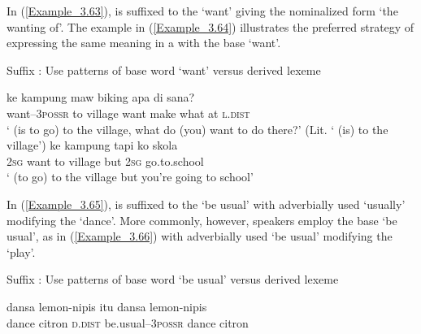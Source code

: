 In (\ref{Example_3.63}),  is suffixed to the   ‘want’ giving the nominalized form  ‘the wanting of’. The example in (\ref{Example_3.64}) illustrates the preferred strategy of expressing the same meaning in a  with the base  ‘want’.



\begin{styleExampleTitle}
{Suffix : Use patterns of base word  ‘want’ versus derived lexeme}
\end{styleExampleTitle}
\ea
\label{Example_3.63}

 {ke} {kampung} {maw} {biking} {apa} {di} {sana?}\\ %
 want–\textsc{3possr}  to  village  want  make  what  at  \textsc{l.dist}\\
 ‘ (is to go) to the village, what do (you) want to do there?’ (Lit. ‘ (is) to the village’) \textstyleExampleSource{[081115-001a-Cv.0046]}
\z
\ea
\label{Example_3.64}
 {} {ke} {kampung} {tapi} {ko} {skola}\\ %
 \textsc{2sg}  want  to  village  but  \textsc{2sg}  go.to.school\\
\glt 
‘ (to go) to the village but you’re going to school’ \textstyleExampleSource{[080922-001a-CvPh.0734]}
\z


In (\ref{Example_3.65}),  is suffixed to the   ‘be usual’ with adverbially used  ‘usually’ modifying the   ‘dance’. More commonly, however, speakers employ the base  ‘be usual’, as in (\ref{Example_3.66}) with adverbially used  ‘be usual’ modifying the   ‘play’.



\begin{styleExampleTitle}
{Suffix : Use patterns of base word  ‘be usual’ versus derived lexeme}
\end{styleExampleTitle}

\ea
\label{Example_3.65}
\gll {\ldots} {dansa} {lemon-nipis} {itu} {} {dansa} {lemon-nipis}\\ %
 {} dance  citron  \textsc{d.dist}  be.usual–\textsc{3possr}  dance  citron\\

